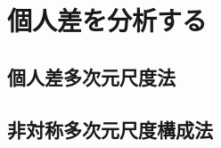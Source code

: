 \documentclass{ltjsbook}
\begin{document}
\chapter{個人差を分析する}
\label{H10_MDS}
\section{個人差多次元尺度法}
\section{非対称多次元尺度構成法}
\end{document}
